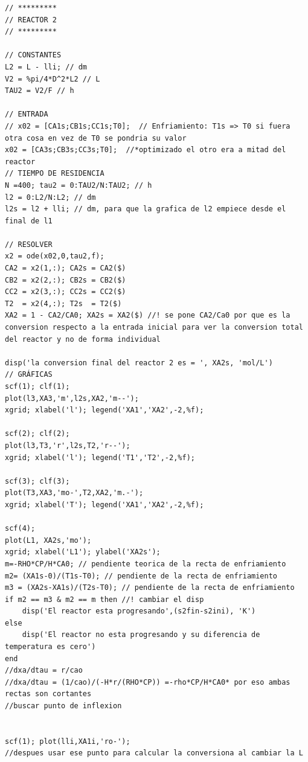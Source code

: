 \begin{verbatim}
// *********
// REACTOR 2
// *********

// CONSTANTES
L2 = L - lli; // dm
V2 = %pi/4*D^2*L2 // L
TAU2 = V2/F // h

// ENTRADA
// x02 = [CA1s;CB1s;CC1s;T0];  // Enfriamiento: T1s => T0 si fuera otra cosa en vez de T0 se pondria su valor
x02 = [CA3s;CB3s;CC3s;T0];  //*optimizado el otro era a mitad del reactor 
// TIEMPO DE RESIDENCIA
N =400; tau2 = 0:TAU2/N:TAU2; // h
l2 = 0:L2/N:L2; // dm
l2s = l2 + lli; // dm, para que la grafica de l2 empiece desde el final de l1

// RESOLVER
x2 = ode(x02,0,tau2,f);
CA2 = x2(1,:); CA2s = CA2($) 
CB2 = x2(2,:); CB2s = CB2($) 
CC2 = x2(3,:); CC2s = CC2($)
T2  = x2(4,:); T2s  = T2($)
XA2 = 1 - CA2/CA0; XA2s = XA2($) //! se pone CA2/Ca0 por que es la conversion respecto a la entrada inicial para ver la conversion total del reactor y no de forma individual   

disp('la conversion final del reactor 2 es = ', XA2s, 'mol/L')
// GRÁFICAS
scf(1); clf(1); 
plot(l3,XA3,'m',l2s,XA2,'m--');
xgrid; xlabel('l'); legend('XA1','XA2',-2,%f); 

scf(2); clf(2); 
plot(l3,T3,'r',l2s,T2,'r--');
xgrid; xlabel('l'); legend('T1','T2',-2,%f); 

scf(3); clf(3); 
plot(T3,XA3,'mo-',T2,XA2,'m.-');
xgrid; xlabel('T'); legend('XA1','XA2',-2,%f); 

scf(4);
plot(L1, XA2s,'mo');
xgrid; xlabel('L1'); ylabel('XA2s'); 
m=-RHO*CP/H*CA0; // pendiente teorica de la recta de enfriamiento
m2= (XA1s-0)/(T1s-T0); // pendiente de la recta de enfriamiento
m3 = (XA2s-XA1s)/(T2s-T0); // pendiente de la recta de enfriamiento
if m2 == m3 & m2 == m then //! cambiar el disp
    disp('El reactor esta progresando',(s2fin-s2ini), 'K')
else
    disp('El reactor no esta progresando y su diferencia de temperatura es cero')
end
//dxa/dtau = r/cao
//dxa/dtau = (1/cao)/(-H*r/(RHO*CP)) =-rho*CP/H*CA0* por eso ambas rectas son cortantes 
//buscar punto de inflexion 


scf(1); plot(lli,XA1i,'ro-');
//despues usar ese punto para calcular la conversiona al cambiar la L 
\end{verbatim}

